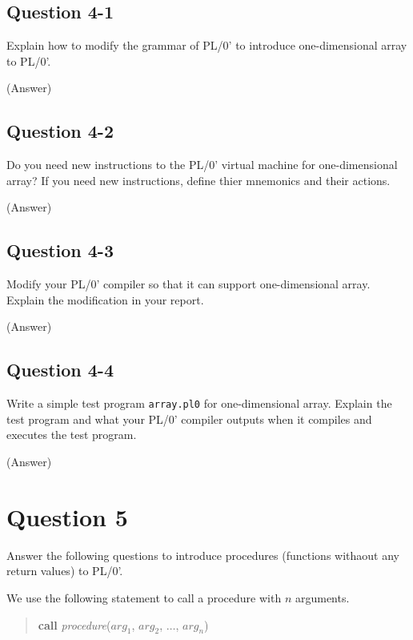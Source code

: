 \documentclass{article}
\begin{document}
\subsection*{Question 4-1}
Explain how to modify the grammar of PL/0' to introduce one-dimensional array to PL/0'.

\ifreport
(Answer)\\
\fi



\subsection*{Question 4-2}
Do you need new instructions to the PL/0' virtual machine for one-dimensional array?
If you need new instructions, define thier mnemonics and their actions. 

\ifreport
(Answer)\\
\fi




\subsection*{Question 4-3}
Modify your PL/0' compiler so that it can support one-dimensional array.
Explain the modification in your report.

\ifreport
(Answer)\\
\fi




\subsection*{Question 4-4}
Write a simple test program {\tt array.pl0} for one-dimensional array.
Explain the test program and what your PL/0' compiler outputs when it
compiles and executes the test program.

\ifreport
(Answer)\\
\fi




\newpage
\section*{Question 5}
Answer the following questions to introduce procedures (functions withaout any return values) to PL/0'.

We use the following statement to call a procedure with $n$ arguments.
\begin{quote}
 {\bf call} {\it procedure}($arg_1$, $arg_2$, $\dots$, $arg_n$)
\end{quote}
\end{document}
